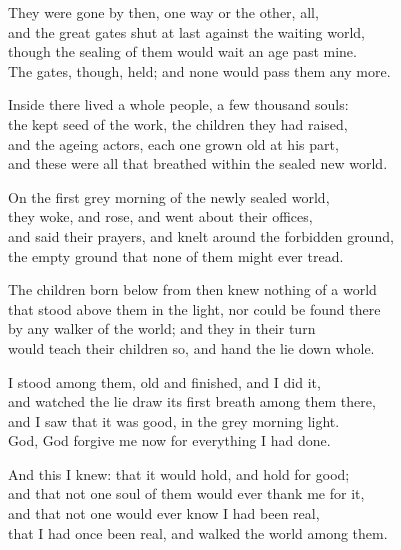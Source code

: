 \begin{founder}
They were gone by then, one way or the other, all,\\
and the great gates shut at last against the waiting world,\\
though the sealing of them would wait an age past mine.\\
The gates, though, held; and none would pass them any more.\\
\medskip

Inside there lived a whole people, a few thousand souls:\\
the kept seed of the work, the children they had raised,\\
and the ageing actors, each one grown old at his part,\\
and these were all that breathed within the sealed new world.\\
\medskip

On the first grey morning of the newly sealed world,\\
they woke, and rose, and went about their offices,\\
and said their prayers, and knelt around the forbidden ground,\\
the empty ground that none of them might ever tread.\\
\medskip

The children born below from then knew nothing of a world\\
that stood above them in the light, nor could be found there\\
by any walker of the world; and they in their turn\\
would teach their children so, and hand the lie down whole.\\
\medskip

I stood among them, old and finished, and I did it,\\
and watched the lie draw its first breath among them there,\\
and I saw that it was good, in the grey morning light.\\
God, God forgive me now for everything I had done.\\
\medskip

And this I knew: that it would hold, and hold for good;\\
and that not one soul of them would ever thank me for it,\\
and that not one would ever know I had been real,\\
that I had once been real, and walked the world among them.\\


\end{founder}
